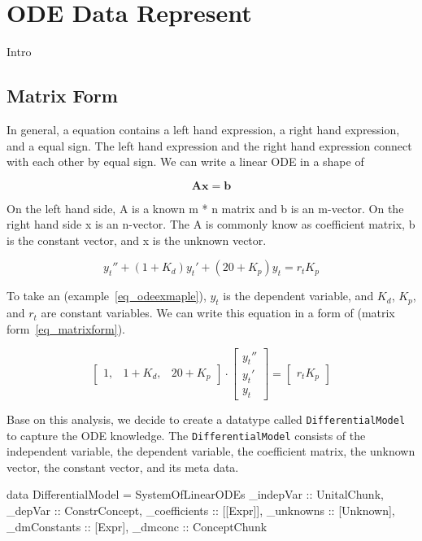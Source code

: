 \chapter{ODE Data Represent}
Intro

\section{Matrix Form}
In general, a equation contains a left hand expression, a right hand expression, and a equal sign. The left hand expression and the right hand expression connect with each other by equal sign. We can write a linear ODE in a shape of

\begin{equation} \label{eq_matrixform}
	\boldsymbol{Ax} = \boldsymbol{b}
\end{equation}

On the left hand side, A is a known m * n matrix and b is an m-vector. On the right hand side x is an n-vector. The A is commonly know as coefficient matrix, b is the constant vector, and x is the unknown vector.

\begin{equation} \label{eq_odeexmaple}
	y_t'' + (1 + K_d)y_t' + (20 + K_p)y_t = r_t K_p
\end{equation}

To take an (example~\ref{eq_odeexmaple}), $y_t$ is the dependent variable, and 
$K_d$, $K_p$, and $r_t$ are constant variables. We can write this equation in a form of (matrix form~\ref{eq_matrixform}).

\[
\begin{bmatrix}
    1, & 1 + K_{d}, & 20 + K_{p}
\end{bmatrix}
\cdot
\begin{bmatrix}
    y_{t}''  \\
    y_{t}'   \\
    y_{t}  
\end{bmatrix}
=
\begin{bmatrix}
    r_{t} K_{p} 
\end{bmatrix}
\]

Base on this analysis, we decide to create a datatype called \verb|DifferentialModel| to capture the ODE knowledge. The \verb|DifferentialModel| consists of the independent variable, the dependent variable, the coefficient matrix, the unknown vector, the constant vector, and its meta data.

\begin{haskell1}
data DifferentialModel = SystemOfLinearODEs {
	_indepVar :: UnitalChunk,
	_depVar :: ConstrConcept,
	_coefficients :: [[Expr]],
	_unknowns :: [Unknown],
	_dmConstants :: [Expr],
	_dmconc :: ConceptChunk
}
\end{haskell1}

